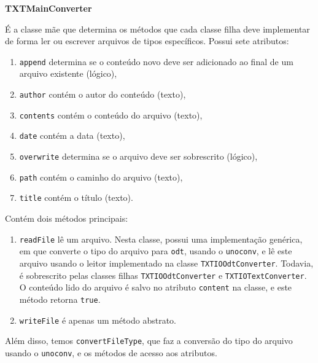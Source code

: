 \vspace{1em}
\textbf{TXTMainConverter}

É a classe mãe que determina os métodos que cada classe filha deve
implementar de forma ler ou escrever arquivos de tipos
específicos. Possui sete atributos:
\begin{enumerate}
\item \verb|append| determina se o conteúdo novo deve ser adicionado
  ao final de um arquivo existente (lógico),
\item \verb|author| contém o autor do conteúdo (texto),
\item \verb|contents| contém o conteúdo do arquivo (texto),
\item \verb|date| contém a data (texto),
\item \verb|overwrite| determina se o arquivo deve ser sobrescrito
  (lógico),
\item \verb|path| contém o caminho do arquivo (texto),
\item \verb|title| contém o título (texto).
\end{enumerate}

Contém dois métodos principais:
\begin{enumerate}
\item \verb|readFile| lê um arquivo. Nesta classe, possui uma
  implementação genérica, em que converte o tipo do arquivo para
  \verb|odt|, usando o \verb|unoconv|, e lê este arquivo usando o
  leitor implementado na classe \verb|TXTIOOdtConverter|. Todavia, é
  sobrescrito pelas classes filhas \verb|TXTIOOdtConverter| e
  \verb|TXTIOTextConverter|. O conteúdo lido do arquivo é salvo no
  atributo \verb|content| na classe, e este método retorna
  \verb|true|.

\item \verb|writeFile| é apenas um método abstrato.
\end{enumerate}

Além disso, temos \verb|convertFileType|, que faz a conversão do tipo
do arquivo usando o \verb|unoconv|, e os métodos de acesso aos
atributos.


